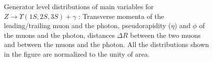 \begin{figure}[!htbp]
\begin{center}
\end{center}%
\caption{Generator level distributions of main variables for $Z\rightarrow  \Upsilon(1S,2S,3S) + \gamma$ : Transverse momenta of the leading/trailing \PT muon and the photon, pseudorapidity ($\eta$) and $\phi$ of the muons and the photon, distances $\Delta R$ between the two muons and between the muons and the photon. All the distributions shown in the figure are normalized to the unity of area.}
\label{fig:MC_ZtoUpsilon_Cat0}
\end{figure}


